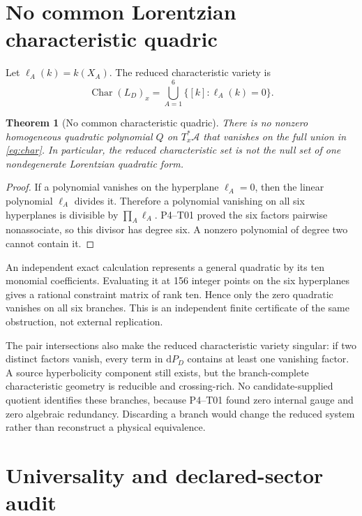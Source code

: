 \documentclass[11pt]{article}
\newcommand{\A}{\mathcal A}
\newcommand{\dd}{\mathrm d}
\newcommand{\Char}{\operatorname{Char}}
\newtheorem{theorem}{Theorem}
\begin{document}
\section{No common Lorentzian characteristic quadric}

Let $\ell_A(k)=k(X_A)$.  The reduced characteristic variety is
\begin{equation}
 \Char(L_D)_x=\bigcup_{A=1}^{6}\{[k]:\ell_A(k)=0\}.
 \label{eq:char}
\end{equation}

\begin{theorem}[No common characteristic quadric]
There is no nonzero homogeneous quadratic polynomial $Q$ on $T_x^*\A$ that
vanishes on the full union in \eqref{eq:char}.  In particular, the reduced
characteristic set is not the null set of one nondegenerate Lorentzian
quadratic form.
\end{theorem}

\begin{proof}
If a polynomial vanishes on the hyperplane $\ell_A=0$, then the linear
polynomial $\ell_A$ divides it.  Therefore a polynomial vanishing on all six
hyperplanes is divisible by $\prod_A\ell_A$.  P4--T01 proved the six factors
pairwise nonassociate, so this divisor has degree six.  A nonzero polynomial
of degree two cannot contain it.
\end{proof}

An independent exact calculation represents a general quadratic by its ten
monomial coefficients.  Evaluating it at 156 integer points on the six
hyperplanes gives a rational constraint matrix of rank ten.  Hence only the
zero quadratic vanishes on all six branches.  This is an independent finite
certificate of the same obstruction, not external replication.

The pair intersections also make the reduced characteristic variety singular:
if two distinct factors vanish, every term in $\dd P_D$ contains at least one
vanishing factor.  A source hyperbolicity component still exists, but the
branch-complete characteristic geometry is reducible and crossing-rich.  No
candidate-supplied quotient identifies these branches, because P4--T01 found
zero internal gauge and zero algebraic redundancy.  Discarding a branch would
change the reduced system rather than reconstruct a physical equivalence.

\section{Universality and declared-sector audit}
\end{document}
